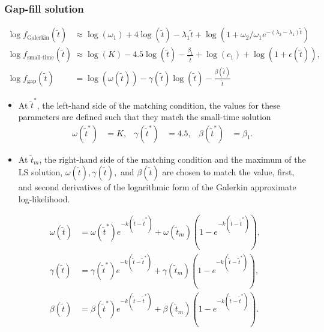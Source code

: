 \documentclass{beamer}
\begin{document}
\begin{frame}
  \frametitle{Gap-fill solution}
  \begin{align*}
    \log f_{\mbox{Galerkin}}(\tilde{t}) &\approx \log(\omega_1) + 4 \log(\tilde{t}) -\lambda_1\tilde{t} + \log\left(1 + \omega_2/\omega_1 e^{-(\lambda_2-\lambda_1)\tilde{t}} \right) \\
    \log f_{\mbox{small-time}}(\tilde{t}) &\approx \log(K) - 4.5\log(\tilde{t})  - \frac{\beta_1}{\tilde{t}} + \log(c_1) + \log\left(1 + \epsilon(\tilde{t}) \right), \\
    \log f_{\mbox{gap}}(\tilde{t}) &= \log(\omega(\tilde{t})) -
                                         \gamma(\tilde{t})\log(\tilde{t}) -
                                         \frac{\beta(\tilde{t})}{\tilde{t}}
  \end{align*}

  \begin{itemize}
  \item At $\tilde{t}^*$, the
    left-hand side of the matching condition, the values for these
    parameters are defined such that they match the small-time solution
    \begin{align*}
      \omega(\tilde{t}^*) &= K, & \gamma(\tilde{t}^*) &= 4.5, & \beta(\tilde{t}^*) &= \beta_1.
    \end{align*}
  \item At $\tilde{t}_m$, the right-hand side of the matching condition and
    the maximum of the LS solution,
    $\omega(\tilde{t}), \gamma(\tilde{t}),$ and $\beta(\tilde{t})$ are
    chosen to match the value, first, and second derivatives of the
    logarithmic form of the Galerkin approximate log-likelihood.
  \end{itemize}
  \end{frame}

  \begin{frame}
    \begin{align*}
      \omega(\tilde{t}) &= \omega(\tilde{t}^*)e^{-k(\tilde{t}-\tilde{t}^*)} + \omega(\tilde{t}_m)\left(1-e^{-k(\tilde{t}-\tilde{t}^*)}\right), \\
      \gamma(\tilde{t}) &= \gamma(\tilde{t}^*)e^{-k(\tilde{t}-\tilde{t}^*)} + \gamma(\tilde{t}_m)\left(1-e^{-k(\tilde{t}-\tilde{t}^*)}\right), \\
      \beta(\tilde{t}) &= \beta(\tilde{t}^*)e^{-k(\tilde{t}-\tilde{t}^*)} + \beta(\tilde{t}_m)\left(1-e^{-k(\tilde{t}-\tilde{t}^*)}\right).
    \end{align*}
  \end{frame}
  
\end{document}

